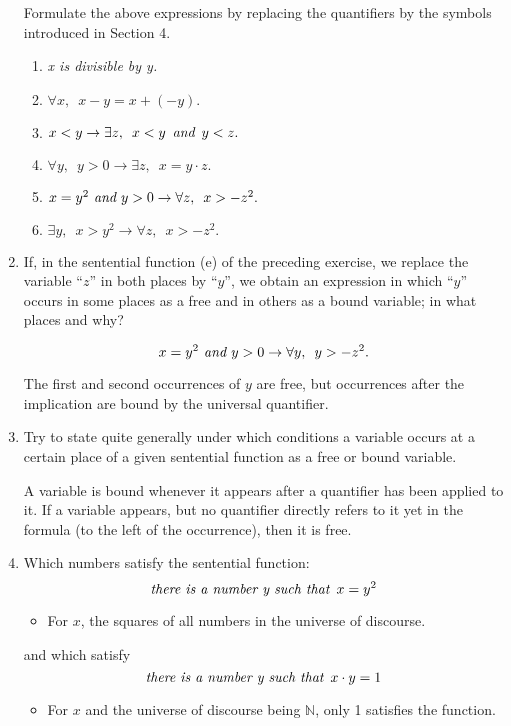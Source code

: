 \begin{enumerate}
  Formulate the above expressions by replacing the quantifiers by the
  symbols introduced in Section 4.

  \begin{enumerate}
  \item \emph{x is divisible by y.}
  \item $\forall x, \enspace x - y = x + (-y).$
  \item $x < y \rightarrow \exists z, \enspace x < y \enspace
    \emph{and} \enspace y < z.$
  \item $\forall y, \enspace y > 0 \rightarrow \exists z, \enspace x =
    y \cdot z.$
  \item $x = y^2 \emph{ and } y > 0 \rightarrow \forall z, \enspace x
    > -z^2.$
  \item $\exists y, \enspace x > y^2 \rightarrow \forall z, \enspace x
    > -z^2.$
  \end{enumerate}

\item If, in the sentential function (e) of the preceding exercise, we
  replace the variable ``$z$'' in both places by ``$y$'', we obtain an
  expression in which ``$y$'' occurs in some places as a free and in
  others as a bound variable; in what places and why?

  \begin{equation*}
    x = y^2 \emph{ and } y > 0 \rightarrow \forall y, \enspace y > -z^2.
  \end{equation*}

  The first and second occurrences of $y$ are free, but occurrences
  after the implication are bound by the universal quantifier.

\item Try to state quite generally under which conditions a variable
  occurs at a certain place of a given sentential function as a free
  or bound variable.

  A variable is bound whenever it appears after a quantifier has been
  applied to it.  If a variable appears, but no quantifier directly
  refers to it yet in the formula (to the left of the occurrence),
  then it is free.

\item Which numbers satisfy the sentential function:
  \begin{equation*}
    \emph{there is a number y such that} \enspace x = y^2
  \end{equation*}
  \begin{itemize}
  \item For $x$, the squares of all numbers in the universe of
    discourse.
  \end{itemize}
  and which satisfy
  \begin{equation*}
    \emph{there is a number y such that} \enspace x \cdot y = 1
  \end{equation*}
  \begin{itemize}
  \item For $x$ and the universe of discourse being $\mathbb{N}$, only
    1 satisfies the function.
  \end{itemize}

\end{enumerate}
